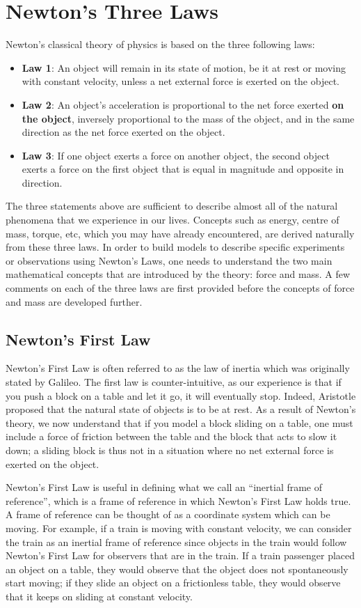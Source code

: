 \section{Newton's Three Laws}
Newton's classical theory of physics is based on the three following laws:
\begin{itemize}
\item \textbf{Law 1}: An object will remain in its state of motion, be it at rest or moving with constant velocity, unless a net external force is exerted on the object.
\item \textbf{Law 2}: An object's acceleration is proportional to the net force exerted \textbf{on the object}, inversely proportional to the mass of the object, and in the same direction as the net force exerted on the object.
\item \textbf{Law 3}: If one object exerts a force on another object, the second object exerts a force on the first object that is equal in magnitude and opposite in direction.
\end{itemize}
The three statements above are sufficient to describe almost all of the natural phenomena that we experience in our lives. Concepts such as energy, centre of mass, torque, etc, which you may have already encountered, are derived naturally from these three laws. In order to build models to describe specific experiments or observations using Newton's Laws, one needs to understand the two main mathematical concepts that are introduced by the theory: force and mass. A few comments on each of the three laws are first provided before the concepts of force and mass are developed further.

\subsection{Newton's First Law}
Newton's First Law is often referred to as the law of inertia which was originally stated by Galileo. The first law is counter-intuitive, as our experience is that if you push a block on a table and let it go, it will eventually stop. Indeed, Aristotle proposed that the natural state of objects is to be at rest. As a result of Newton's theory, we now understand that if you model a block sliding on a table, one must include a force of friction between the table and the block that acts to slow it down; a sliding block is thus not in a situation where no net external force is exerted on the object.

Newton's First Law is useful in defining what we call an ``inertial frame of reference'', which is a frame of reference in which Newton's First Law holds true. A frame of reference can be thought of as a coordinate system which can be moving. For example, if a train is moving with constant velocity, we can consider the train as an inertial frame of reference since objects in the train would follow Newton's First Law for observers that are in the train. If a train passenger placed an object on a table, they would observe that the object does not spontaneously start moving; if they slide an object on a frictionless table, they would observe that it keeps on sliding at constant velocity.

